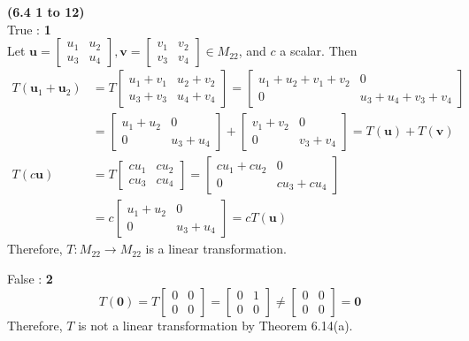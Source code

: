 \textbf{(6.4 1 to 12)} \\
True : \textbf{1} \\
Let $\textbf{u} = \begin{bmatrix}
	u_1 & u_2 \\ u_3 & u_4
\end{bmatrix}, \textbf{v} = \begin{bmatrix}
	v_1 & v_2 \\ v_3 & v_4
\end{bmatrix} \in M_{22}$, and $c$ a scalar. Then \begin{align*}
	T(\textbf{u}_1 + \textbf{u}_2) &= T\begin{bmatrix}
		u_1 + v_1 & u_2 + v_2 \\ u_3 + v_3 & u_4 + v_4
	\end{bmatrix} = \begin{bmatrix}
		u_1 + u_2 + v_1 + v_2 & 0 \\ 0 & u_3 + u_4 + v_3 + v_4
	\end{bmatrix} \\
	&= \begin{bmatrix}
		u_1 + u_2 & 0 \\ 0 & u_3 + u_4
	\end{bmatrix} + \begin{bmatrix}
		v_1 + v_2 & 0 \\ 0 & v_3 + v_4
	\end{bmatrix} = T(\textbf{u}) + T(\textbf{v}) \\
	T(c\textbf{u}) &= T\begin{bmatrix}
		cu_1 & cu_2 \\ cu_3 & cu_4
	\end{bmatrix} = \begin{bmatrix}
		cu_1 + cu_2 & 0 \\ 0 & cu_3 + cu_4
	\end{bmatrix} \\
	&= c\begin{bmatrix}
		u_1 + u_2 & 0 \\ 0 & u_3 + u_4
	\end{bmatrix} = cT(\textbf{u})
\end{align*} Therefore, $T: M_{22} \rightarrow M_{22}$ is a linear transformation.

False : \textbf{2} \\
\begin{equation*}
	T(\textbf{0}) = T\begin{bmatrix}
		0 & 0 \\ 0 & 0
	\end{bmatrix} = \begin{bmatrix}
		0 & 1 \\ 0 & 0
	\end{bmatrix} \neq \begin{bmatrix}
		0 & 0 \\ 0 & 0
	\end{bmatrix} = \textbf{0}
\end{equation*} Therefore, $T$ is not a linear transformation by Theorem 6.14(a). \\

